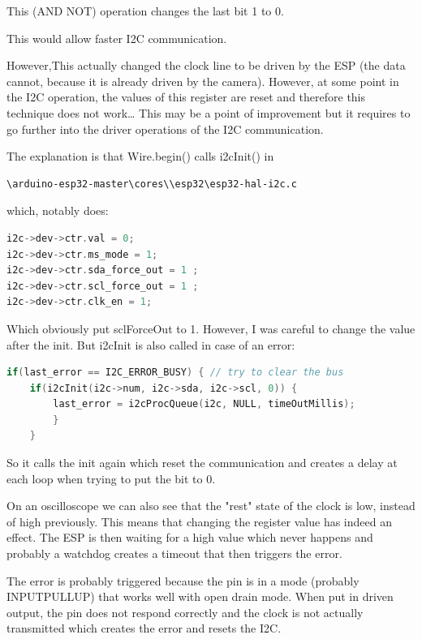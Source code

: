 \documentclass[a4paper]{article}
\begin{document}
This (AND NOT) operation changes the last bit 1 to 0.

This would allow faster I2C communication.

However,This actually changed the clock line to be driven by the ESP (the data cannot, because it is already driven by the camera). However, at some point in the I2C operation, the values of this register are reset and therefore this technique does not work… This may be a point of improvement but it requires to go further into the driver operations of the I2C communication. 

The explanation is that Wire.begin() calls i2cInit() in
\begin{lstlisting}
\arduino-esp32-master\cores\\esp32\esp32-hal-i2c.c
\end{lstlisting}which, notably does:

\begin{lstlisting}[language=C++]
i2c->dev->ctr.val = 0;
i2c->dev->ctr.ms_mode = 1;
i2c->dev->ctr.sda_force_out = 1 ;
i2c->dev->ctr.scl_force_out = 1 ;
i2c->dev->ctr.clk_en = 1;
\end{lstlisting}

Which obviously put sclForceOut to 1. However, I was careful to change the value after the init. But i2cInit is also called in case of an error:

\begin{lstlisting}[language=C++]
if(last_error == I2C_ERROR_BUSY) { // try to clear the bus
    if(i2cInit(i2c->num, i2c->sda, i2c->scl, 0)) {
        last_error = i2cProcQueue(i2c, NULL, timeOutMillis);
        }
    }
\end{lstlisting}

So it calls the init again which reset the communication and creates a delay at each loop when trying to put the bit to 0. 

On an oscilloscope we can also see that the "rest" state of the clock is low, instead of high previously. This means that changing the register value has indeed an effect. The ESP is then waiting for a high value which never happens and probably a watchdog creates a timeout that then triggers the error.

 The error is probably triggered because the pin is in a mode (probably INPUTPULLUP) that works well with open drain mode. When put in driven output, the pin does not respond correctly and the clock is not actually transmitted which creates the error and resets the I2C.
\end{document}
